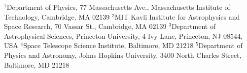 {\tiny\noindent
$^1$Department of Physics, 77 Massachusetts Ave., Massachusetts 
Institute of Technology, Cambridge, MA 02139\newline
\noindent$^2$MIT Kavli Institute for Astrophysics and Space Research, 70 Vassar
St., Cambridge, MA 02139\newline
\noindent$^3$Department of Astrophysical Sciences, Princeton University, 4 Ivy 
Lane, Princeton, NJ 08544, USA\newline	
\noindent$^4$Space Telescope Science Institute, Baltimore, MD 21218\newline
\vspace{-0.222cm} \noindent$^5$Department of Physics and Astronomy, Johns 
Hopkins 
University, 3400 North Charles Street, Baltimore, MD 21218 }
\vspace{-0.1cm}